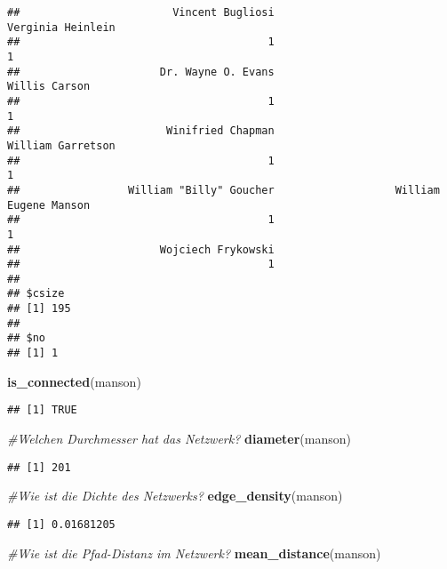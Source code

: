 \documentclass[
]{article}
\newenvironment{Shaded}{\begin{snugshade}}{\end{snugshade}}
\newcommand{\CommentTok}[1]{\textcolor[rgb]{0.56,0.35,0.01}{\textit{#1}}}
\newcommand{\KeywordTok}[1]{\textcolor[rgb]{0.13,0.29,0.53}{\textbf{#1}}}
\newcommand{\NormalTok}[1]{#1}
\begin{document}
\begin{verbatim}
##                        Vincent Bugliosi                       Verginia Heinlein 
##                                       1                                       1 
##                      Dr. Wayne O. Evans                           Willis Carson 
##                                       1                                       1 
##                       Winifried Chapman                       William Garretson 
##                                       1                                       1 
##                 William "Billy" Goucher                   William Eugene Manson 
##                                       1                                       1 
##                      Wojciech Frykowski 
##                                       1 
## 
## $csize
## [1] 195
## 
## $no
## [1] 1
\end{verbatim}

\begin{Shaded}
\begin{Highlighting}[]
\KeywordTok{is_connected}\NormalTok{(manson)}
\end{Highlighting}
\end{Shaded}

\begin{verbatim}
## [1] TRUE
\end{verbatim}

\begin{Shaded}
\begin{Highlighting}[]
\CommentTok{#Welchen    Durchmesser hat das Netzwerk?}
\KeywordTok{diameter}\NormalTok{(manson)}
\end{Highlighting}
\end{Shaded}

\begin{verbatim}
## [1] 201
\end{verbatim}

\begin{Shaded}
\begin{Highlighting}[]
\CommentTok{#Wie    ist die Dichte  des Netzwerks?}
\KeywordTok{edge_density}\NormalTok{(manson)}
\end{Highlighting}
\end{Shaded}

\begin{verbatim}
## [1] 0.01681205
\end{verbatim}

\begin{Shaded}
\begin{Highlighting}[]
\CommentTok{#Wie    ist die Pfad-Distanz    im  Netzwerk?}
\KeywordTok{mean_distance}\NormalTok{(manson)}
\end{Highlighting}
\end{Shaded}
\end{document}
